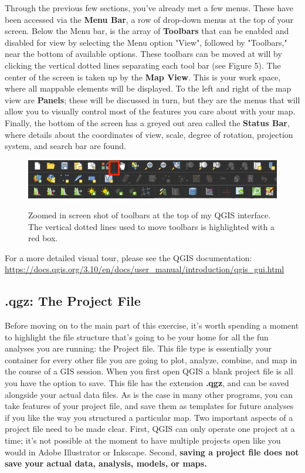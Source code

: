 \documentclass{article}
\begin{document}
Through the previous few sections, you've already met a few menus. These have been accessed via the \textbf{Menu Bar}, a row of drop-down menus at the top of your screen. Below the Menu bar, is the array of \textbf{Toolbars} that can be enabled and disabled for view by selecting the Menu option "View", followed by "Toolbars," near the bottom of available options. These toolbars can be moved at will by clicking the vertical dotted lines separating each tool bar (see Figure 5). The center of the screen is taken up by the \textbf{Map View}. This is your work space, where all mappable elements will be displayed. To the left and right of the map view are \textbf{Panels}; these will be discussed in turn, but they are the menus that will allow you to visually control most of the features you care about with your map. Finally, the bottom of the screen has a greyed out area called the \textbf{Status Bar}, where details about the coordinates of view, scale, degree of rotation, projection system, and search bar are found. 

\begin{figure}[htbp]
    \centering
    \includegraphics[width=\textwidth]{Fig_6_Toolbars.png}
    \label{fig6}
    \caption{Zoomed in screen shot of toolbars at the top of my QGIS interface. The vertical dotted lines used to move toolbars is highlighted with a red box.}
\end{figure}

For a more detailed visual tour, please see the QGIS documentation: \url{https://docs.qgis.org/3.10/en/docs/user_manual/introduction/qgis_gui.html}

\subsection{.qgz: The Project File}

Before moving on to the main part of this exercise, it's worth spending a moment to highlight the file structure that's going to be your home for all the fun analyses you are running: the Project file. This file type is essentially your container for every other file you are going to plot, analyze, combine, and map in the course of a GIS session. When you first open QGIS a blank project file is all you have the option to save. This file has the extension \textbf{.qgz}, and can be saved alongside your actual data files. As is the case in many other programs, you can take features of your project file, and save them as templates for future analyses if you like the way you structured a particular map. Two important aspects of a project file need to be made clear. First, QGIS can only operate one project at a time; it's not possible at the moment to have multiple projects open like you would in Adobe Illustrator or Inkscape. Second, \textbf{saving a project file does not save your actual data, analysis, models, or maps.} 
\end{document}
